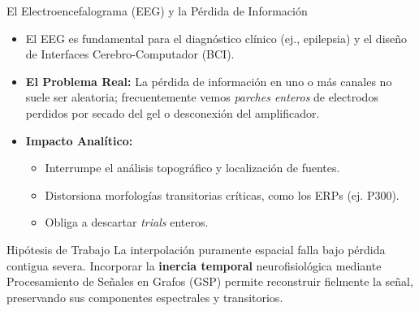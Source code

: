 \documentclass[10pt, aspectratio=169]{beamer}
\begin{document}
\begin{frame}{El Electroencefalograma (EEG) y la Pérdida de Información}
    \begin{itemize}
        \item El EEG es fundamental para el diagnóstico clínico (ej., epilepsia) y el diseño de Interfaces Cerebro-Computador (BCI).
        \item \textbf{El Problema Real:} La pérdida de información en uno o más canales no suele ser aleatoria; frecuentemente vemos \textit{parches enteros} de electrodos perdidos por secado del gel o desconexión del amplificador.
        \item \textbf{Impacto Analítico:}
        \begin{itemize}
            \item Interrumpe el análisis topográfico y localización de fuentes.
            \item Distorsiona morfologías transitorias críticas, como los ERPs (ej. P300).
            \item Obliga a descartar \textit{trials} enteros.
        \end{itemize}
    \end{itemize}
    
    \vspace{0.2cm}
    \begin{block}{Hipótesis de Trabajo}
        La interpolación puramente espacial falla bajo pérdida contigua severa. Incorporar la \textbf{inercia temporal} neurofisiológica mediante Procesamiento de Señales en Grafos (GSP) permite reconstruir fielmente la señal, preservando sus componentes espectrales y transitorios.
    \end{block}
\end{frame}
\end{document}
